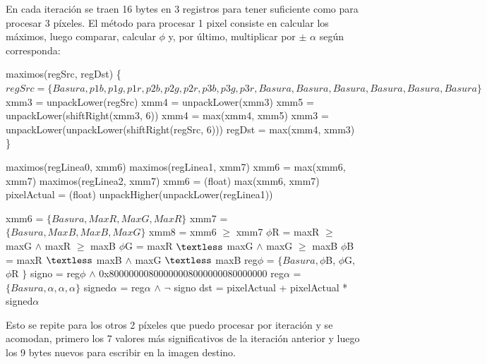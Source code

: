 En cada iteración se traen 16 bytes en 3 registros para tener suficiente como para procesar 3 píxeles.
El método para procesar 1 pixel consiste en calcular los máximos, luego comparar, calcular $\phi$ y, por último, multiplicar por $\pm$ $\alpha$ según corresponda:

\begin{pseudocodigo}
	\STATE maximos(regSrc, regDst) \{
	\INDSTATE[2] $regSrc = \{Basura, p1b, p1g, p1r, p2b, p2g, p2r, p3b, p3g, p3r, Basura, Basura, Basura, Basura, Basura, Basura\}$
	\INDSTATE[2] xmm3 = unpackLower(regSrc)
	\INDSTATE[2] xmm4 = unpackLower(xmm3)
	\INDSTATE[2] xmm5 = unpackLower(shiftRight(xmm3, 6))
	\INDSTATE[2] xmm4 = max(xmm4, xmm5)
	\INDSTATE[2] xmm3 = unpackLower(unpackLower(shiftRight(regSrc, 6)))
	\INDSTATE[2] regDst = max(xmm4, xmm3) 
    \STATE \}
\end{pseudocodigo}

\begin{pseudocodigo}
	\STATE maximos(regLinea0, xmm6)
	\STATE maximos(regLinea1, xmm7)
	\STATE xmm6 = max(xmm6, xmm7)
	\STATE maximos(regLinea2, xmm7)
	\STATE xmm6 = (float) max(xmm6, xmm7) 
	\STATE pixelActual = (float) unpackHigher(unpackLower(regLinea1)) 
	
	\STATE xmm6 = $\{Basura, MaxR, MaxG, MaxR\}$
	\STATE xmm7 = $\{Basura, MaxB, MaxB, MaxG\}$
	\STATE xmm8 = xmm6 $\geq$ xmm7
	\STATE $\phi$R = maxR $\geq$ maxG $\land$ maxR $\geq$ maxB
	\STATE $\phi$G = maxR $\textless$ maxG $\land$ maxG $\geq$ maxB
	\STATE $\phi$B = maxR $\textless$ maxB $\land$ maxG $\textless$ maxB
	\STATE reg$\phi$ = $\{Basura, \phi$B, $\phi$G, $\phi$R $\}$
	\STATE signo = reg$\phi$ $\land$ 0x80000000800000008000000080000000
	\STATE reg$\alpha$ = $\{ Basura, \alpha, \alpha, \alpha\}$
	\STATE signed$\alpha$ = reg$\alpha$ $\land$ $\neg$ signo 
	\STATE dst = pixelActual + pixelActual * signed$\alpha$ 
	
\end{pseudocodigo}

Esto se repite para los otros 2 píxeles que puedo procesar por iteración y se acomodan, primero los 7 valores más significativos de la iteración anterior y luego los 9 bytes nuevos para escribir en la imagen destino.

